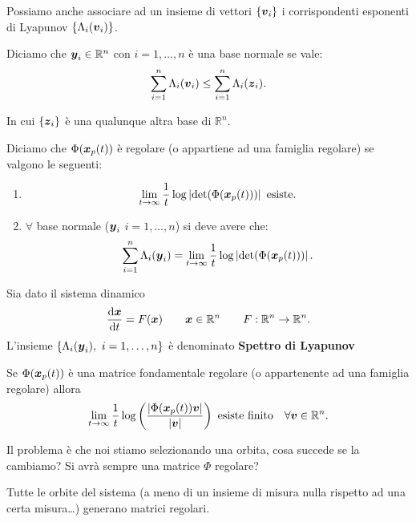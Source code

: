 \noindent
Possiamo anche associare ad un insieme di vettori $\left\{\boldsymbol{v}_i\right\}$ i corrispondenti esponenti di Lyapunov $\left\{\Lambda_i (\boldsymbol{v}_i) \right\}$.  
\begin{defn}
    Diciamo che $\boldsymbol{y}_i\in \mathbb{R}^n$  con $i = 1, \ldots, n$ è una base normale se vale:
    \[
	\sum_{i=1}^{n} \Lambda_i(\boldsymbol{v}_i) \le \sum_{i=1}^{n} \Lambda_i(\boldsymbol{z}_i)
    .\] 
\end{defn}
\noindent
In cui $\left\{\boldsymbol{z}_i\right\}$ è una qualunque altra base di $\mathbb{R}^n$.
\begin{defn}
    Diciamo che $\Phi (\boldsymbol{x}_p(t)) $ è regolare (o appartiene ad una famiglia regolare) se valgono le seguenti:
    \begin{enumerate}
        \item \[
		\lim_{t \to \infty} \frac{1}{t}\log\left|\text{det}(\Phi (\boldsymbol{x}_p(t)))\right| \text{ esiste}
        .\] 
    \item $\forall$ base normale ($\boldsymbol{y}_i$ $i= 1, \ldots, n$) si deve avere che:
	\[
	    \sum_{i=1}^{n} \Lambda_i(\boldsymbol{y}_i) = \lim_{t \to \infty} \frac{1}{t}\log\left|\text{det}(\Phi (\boldsymbol{x}_p(t)))\right|
	.\] 
    \end{enumerate}
\end{defn}
\noindent
\begin{defn}
    Sia dato il sistema dinamico 
    \[
	\frac{\text{d} \boldsymbol{x}}{\text{d} t} = F(\boldsymbol{x}) \qquad\boldsymbol{x}\in \mathbb{R}^n \qquad  F:\mathbb{R}^n\to \mathbb{R}^n
    .\] 
    L'insieme $\left\{\Lambda_i(\boldsymbol{y}_i) , \ i = 1, \ldots, n\right\}$ è denominato \textbf{Spettro di Lyapunov}

\end{defn}
\noindent
\begin{thm}[]
    Se $\Phi (\boldsymbol{x}_p(t))$ è una matrice fondamentale regolare (o appartenente ad una famiglia regolare) allora
    \[
	\lim_{t \to \infty} \frac{1}{t}\log\left( \frac{\left|\Phi (\boldsymbol{x}_p(t)) \boldsymbol{v}\right|}{\left|\boldsymbol{v}\right|} \right) \text{ esiste finito} \quad  
	\forall \boldsymbol{v}\in \mathbb{R}^n
    .\] 
\end{thm}
\noindent
Il problema è che noi stiamo selezionando una orbita, cosa succede se la cambiamo? Si avrà sempre una matrice $\Phi$  regolare?
\begin{thm}
    Tutte le orbite del sistema (a meno di un insieme di misura nulla rispetto ad una certa misura\ldots) generano matrici regolari. 
\end{thm}
